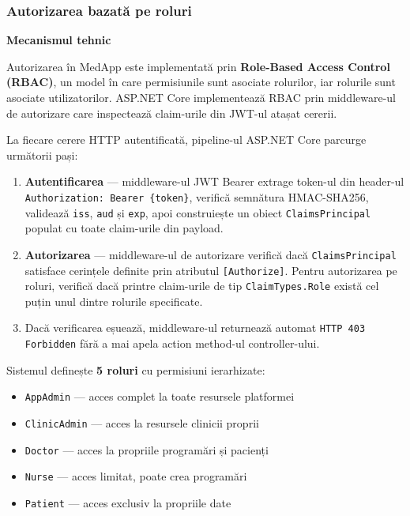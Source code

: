 \documentclass[12pt, a4paper]{report}
\begin{document}
\subsubsection{Autorizarea bazată pe roluri}

\textbf{Mecanismul tehnic}

Autorizarea în MedApp este implementată prin \textbf{Role-Based Access Control (RBAC)},
un model în care permisiunile sunt asociate rolurilor, iar rolurile sunt asociate
utilizatorilor. ASP.NET Core implementează RBAC prin middleware-ul de autorizare care
inspectează claim-urile din JWT-ul atașat cererii.

La fiecare cerere HTTP autentificată, pipeline-ul ASP.NET Core parcurge următorii pași:

\begin{enumerate}
    \item \textbf{Autentificarea} --- middleware-ul JWT Bearer extrage token-ul din
          header-ul \texttt{Authorization: Bearer \{token\}}, verifică semnătura
          HMAC-SHA256, validează \texttt{iss}, \texttt{aud} și \texttt{exp}, apoi
          construiește un obiect \texttt{ClaimsPrincipal} populat cu toate claim-urile
          din payload.
    \item \textbf{Autorizarea} --- middleware-ul de autorizare verifică dacă
          \texttt{ClaimsPrincipal} satisface cerințele definite prin atributul
          \texttt{[Authorize]}. Pentru autorizarea pe roluri, verifică dacă printre
          claim-urile de tip \texttt{ClaimTypes.Role} există cel puțin unul dintre
          rolurile specificate.
    \item Dacă verificarea eșuează, middleware-ul returnează automat \texttt{HTTP 403
          Forbidden} fără a mai apela action method-ul controller-ului.
\end{enumerate}

Sistemul definește \textbf{5 roluri} cu permisiuni ierarhizate:

\begin{itemize}
    \item \texttt{AppAdmin} --- acces complet la toate resursele platformei
    \item \texttt{ClinicAdmin} --- acces la resursele clinicii proprii
    \item \texttt{Doctor} --- acces la propriile programări și pacienți
    \item \texttt{Nurse} --- acces limitat, poate crea programări
    \item \texttt{Patient} --- acces exclusiv la propriile date
\end{itemize}
\end{document}
